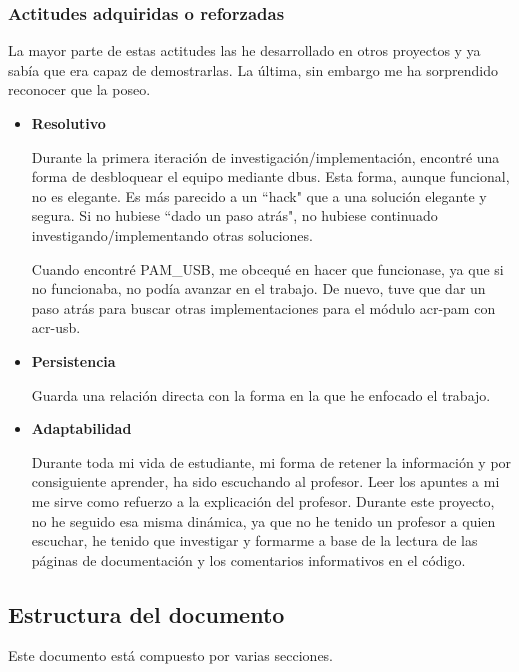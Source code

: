 \documentclass[titlepage, 12pt, a4paper]{article}
\begin{document}
\subsubsection{Actitudes adquiridas o reforzadas}
La mayor parte de estas actitudes las he desarrollado en otros proyectos y ya sabía que era capaz de demostrarlas. La última, sin embargo me ha sorprendido reconocer que la poseo.
\begin{itemize}
	\item{\textbf{Resolutivo}}\par Durante la primera iteración de investigación/implementación, encontré una forma de desbloquear el equipo mediante \gls{dbus}. Esta forma, aunque funcional, no es elegante. Es más parecido a un ``hack" que a una solución elegante y segura. Si no hubiese ``dado un paso atrás", no hubiese continuado investigando/implementando otras soluciones. \par Cuando encontré PAM\_USB, me obcequé en hacer que funcionase, ya que si no funcionaba, no podía avanzar en el trabajo. De nuevo, tuve que dar un paso atrás para buscar otras implementaciones para el módulo \gls{acr-pam} con \gls{acr-usb}.
	\item{\textbf{Persistencia}}\par Guarda una relación directa con la forma en la que he enfocado el trabajo.
	\item{\textbf{Adaptabilidad}}\par Durante toda mi vida de estudiante, mi forma de retener la información y por consiguiente aprender, ha sido escuchando al profesor. Leer los apuntes a mi me sirve como refuerzo a la explicación del profesor. Durante este proyecto, no he seguido esa misma dinámica, ya que no he tenido un profesor a quien escuchar, he tenido que investigar y formarme a base de la lectura de las páginas de documentación y los comentarios informativos en el código.
\end{itemize}
\subsection{Estructura del documento}
Este documento está compuesto por varias secciones.
\clearpage
\end{document}
